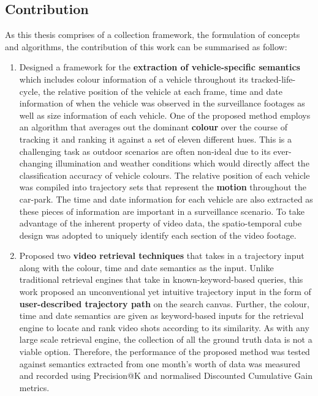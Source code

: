 \subsection{Contribution}
As this thesis comprises of a collection framework, the formulation of concepts and algorithms, the contribution of this work can be summarised as follow:


\begin{enumerate}
\item Designed a framework for the \textbf{extraction of vehicle-specific semantics} which includes colour information of a vehicle throughout its tracked-life-cycle, the relative position of the vehicle at each frame, time and date information of when the vehicle was observed in the surveillance footages as well as size information of each vehicle. One of the proposed method employs an algorithm that averages out the dominant \textbf{colour} over the course of tracking it and ranking it against a set of eleven different hues. This is a challenging task as outdoor scenarios are often non-ideal due to its ever-changing illumination and weather conditions which would directly affect the classification accuracy of vehicle colours. The relative position of each vehicle was compiled into trajectory sets that represent the \textbf{motion} throughout the car-park. The time and date information for each vehicle are also extracted as these pieces of information are important in a surveillance scenario. To take advantage of the inherent property of video data, the spatio-temporal cube design was adopted to uniquely identify each section of the video footage.
\item Proposed two \textbf{video retrieval techniques} that takes in a trajectory input along with the colour, time and date semantics as the input. Unlike traditional retrieval engines that take in known-keyword-based queries, this work proposed an unconventional yet intuitive trajectory input in the form of \textbf{user-described trajectory path} on the search canvas. Further, the colour, time and date semantics are given as keyword-based inputs for the retrieval engine to locate and rank video shots according to its similarity. As with any large scale retrieval engine, the collection of all the ground truth data is not a viable option. Therefore, the performance of the proposed method was tested against semantics extracted from one month's worth of data was measured and recorded using Precision@K and normalised Discounted Cumulative Gain metrics.
\end{enumerate}

